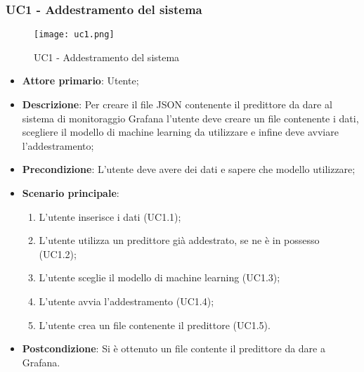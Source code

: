 \subsubsection{UC1 - Addestramento del sistema}%
\label{sssec:uc1}

\begin{figure}[h!]
  \begin{center}
    \texttt{[image: uc1.png]}\\
    \caption{UC1 - Addestramento del sistema}%
    \label{fig:uc1}
  \end{center}
  \end{figure}

\begin{itemize}
  \item \textbf{Attore primario}: Utente;
  \item \textbf{Descrizione}: Per creare il file JSON contenente il predittore da dare al sistema di monitoraggio Grafana l'utente deve creare un file contenente i dati, scegliere il modello di machine learning da utilizzare e infine deve avviare l'addestramento;
  \item \textbf{Precondizione}: L'utente deve avere dei dati e sapere che modello utilizzare;
  \item \textbf{Scenario principale}:
  \begin{enumerate}
    \item L'utente inserisce i dati (UC1.1);
    \item L'utente utilizza un predittore già addestrato, se ne è in possesso (UC1.2);
    \item L'utente sceglie il modello di machine learning (UC1.3);
    \item L'utente avvia l'addestramento (UC1.4);
    \item L'utente crea un file contenente il predittore (UC1.5).
  \end{enumerate}
    \item \textbf{Postcondizione}: Si è ottenuto un file contente il predittore da dare a Grafana.
\end{itemize}

